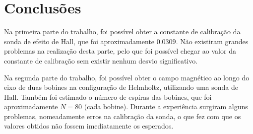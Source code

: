 
\chapter{Conclusões}
\label{ch:conclusoes}
{

Na primeira parte do trabalho, foi possível obter a constante de calibração da sonda de efeito de Hall, que foi aproximadamente $0.0309$. Não existiram grandes problemas na realização desta parte, pelo que foi possível chegar ao valor da constante de calibração sem existir nenhum desvio significativo.

Na segunda parte do trabalho, foi possível obter o campo magnético ao longo do eixo de duas bobines na configuração de Helmholtz, utilizando uma sonda de Hall. Também foi estimado o número de espiras das bobines, que foi aproximadamente $N = 80$ (cada bobine). Durante a experiência surgiram alguns problemas, nomeadamente erros na calibração da sonda, o que fez com que os valores obtidos não fossem imediatamente os esperados.

}

